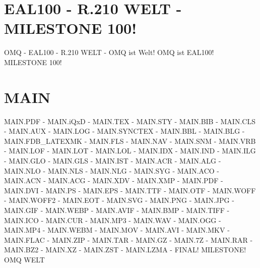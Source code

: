 \documentclass{MAIN}
\begin{document}
\maketitle
\section*{EAL100 - R.210 WELT - MILESTONE 100!}
OMQ - EAL100 - R.210 WELT - OMQ ist Welt! OMQ ist EAL100! MILESTONE 100!
\section*{MAIN}
MAIN.PDF - MAIN.iQxD - MAIN.TEX - MAIN.STY - MAIN.BIB - MAIN.CLS - MAIN.AUX - MAIN.LOG - MAIN.SYNCTEX - MAIN.BBL - MAIN.BLG - MAIN.FDB_LATEXMK - MAIN.FLS - MAIN.NAV - MAIN.SNM - MAIN.VRB - MAIN.LOF - MAIN.LOT - MAIN.LOL - MAIN.IDX - MAIN.IND - MAIN.ILG - MAIN.GLO - MAIN.GLS - MAIN.IST - MAIN.ACR - MAIN.ALG - MAIN.NLO - MAIN.NLS - MAIN.NLG - MAIN.SYG - MAIN.ACO - MAIN.ACN - MAIN.ACG - MAIN.XDV - MAIN.XMP - MAIN.PDF - MAIN.DVI - MAIN.PS - MAIN.EPS - MAIN.TTF - MAIN.OTF - MAIN.WOFF - MAIN.WOFF2 - MAIN.EOT - MAIN.SVG - MAIN.PNG - MAIN.JPG - MAIN.GIF - MAIN.WEBP - MAIN.AVIF - MAIN.BMP - MAIN.TIFF - MAIN.ICO - MAIN.CUR - MAIN.MP3 - MAIN.WAV - MAIN.OGG - MAIN.MP4 - MAIN.WEBM - MAIN.MOV - MAIN.AVI - MAIN.MKV - MAIN.FLAC - MAIN.ZIP - MAIN.TAR - MAIN.GZ - MAIN.7Z - MAIN.RAR - MAIN.BZ2 - MAIN.XZ - MAIN.ZST - MAIN.LZMA - FINAL! MILESTONE!
\cite{omq_eal100}
\ac{OMQ}
\ac{WELT}

\printindex
\printglossary
\printnomenclature
\printacronyms
\end{document}
